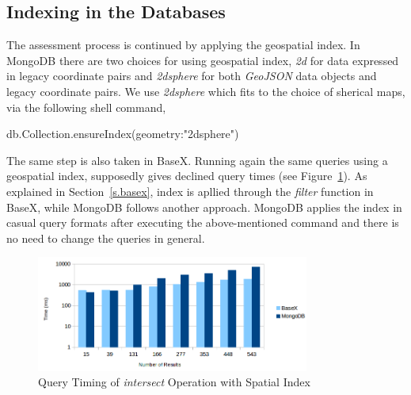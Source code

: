 \documentclass[a4paper,12pt]{article}
\begin{document}
\subsection{Indexing in the Databases}
\label{index}
The assessment process is continued by applying the geospatial index. In MongoDB there are two choices for using geospatial index, \textit{2d} for data expressed in legacy coordinate pairs and \textit{2dsphere} for both \textit{GeoJSON} data objects and legacy coordinate pairs. We use \textit{2dsphere} which fits to the choice of sherical maps, via the following shell command,
\vspace{10px}
\begin{fakeJSON}
db.Collection.ensureIndex({geometry:"2dsphere"}) 
\end{fakeJSON}
\vspace{10px}
The same step is also taken in BaseX. Running again the same queries using a geospatial index, supposedly gives declined query times (see Figure~\ref{figBXvsMongoIndexIntersects}). As explained in Section~\ref{s.basex}, index is apllied through the \textit{filter} function in BaseX, while MongoDB follows another approach. MongoDB applies the index in casual query formats after executing the above-mentioned command and there is no need to change the queries in general. 


\begin{figure}
\centering
\includegraphics[width=0.8\textwidth]{BXvsMongo-Intersects-Index-log}
\caption{Query Timing of \textit{intersect} Operation with Spatial Index}
\label{figBXvsMongoIndexIntersects}
\end{figure}

\end{document}
